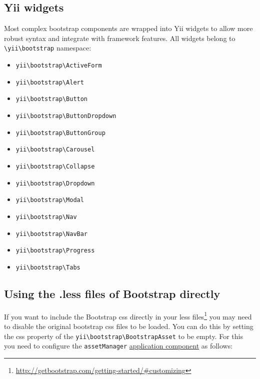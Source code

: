 \subsection{Yii widgets}
Most complex bootstrap components are wrapped into Yii widgets to allow more robust syntax and integrate with
framework features. All widgets belong to \lstinline|\yii\bootstrap| namespace:

\begin{itemize}
\item \texttt{yii{\allowbreak{}\textbackslash}bootstrap{\allowbreak{}\textbackslash}ActiveForm}
\item \texttt{yii{\allowbreak{}\textbackslash}bootstrap{\allowbreak{}\textbackslash}Alert}
\item \texttt{yii{\allowbreak{}\textbackslash}bootstrap{\allowbreak{}\textbackslash}Button}
\item \texttt{yii{\allowbreak{}\textbackslash}bootstrap{\allowbreak{}\textbackslash}ButtonDropdown}
\item \texttt{yii{\allowbreak{}\textbackslash}bootstrap{\allowbreak{}\textbackslash}ButtonGroup}
\item \texttt{yii{\allowbreak{}\textbackslash}bootstrap{\allowbreak{}\textbackslash}Carousel}
\item \texttt{yii{\allowbreak{}\textbackslash}bootstrap{\allowbreak{}\textbackslash}Collapse}
\item \texttt{yii{\allowbreak{}\textbackslash}bootstrap{\allowbreak{}\textbackslash}Dropdown}
\item \texttt{yii{\allowbreak{}\textbackslash}bootstrap{\allowbreak{}\textbackslash}Modal}
\item \texttt{yii{\allowbreak{}\textbackslash}bootstrap{\allowbreak{}\textbackslash}Nav}
\item \texttt{yii{\allowbreak{}\textbackslash}bootstrap{\allowbreak{}\textbackslash}NavBar}
\item \texttt{yii{\allowbreak{}\textbackslash}bootstrap{\allowbreak{}\textbackslash}Progress}
\item \texttt{yii{\allowbreak{}\textbackslash}bootstrap{\allowbreak{}\textbackslash}Tabs}
\end{itemize}
\subsection{Using the .less files of Bootstrap directly}
If you want to include the Bootstrap css directly in your less files\footnote{\url{http://getbootstrap.com/getting-started/\#customizing}}
you may need to disable the original bootstrap css files to be loaded.
You can do this by setting the css property of the \texttt{yii{\allowbreak{}\textbackslash}bootstrap{\allowbreak{}\textbackslash}BootstrapAsset} to be empty.
For this you need to configure the \lstinline|assetManager| \hyperref[structure-application-components.md]{application component} as follows:

